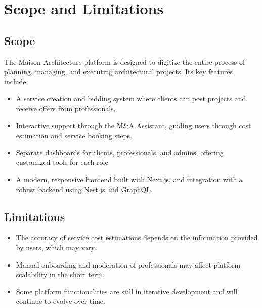 \section{Scope and Limitations}

\subsection*{Scope}
The Maison Architecture platform is designed to digitize the entire process of planning, managing, and executing architectural projects. Its key features include:
\begin{itemize}
    \item A service creation and bidding system where clients can post projects and receive offers from professionals.
    \item Interactive support through the M\&A Assistant, guiding users through cost estimation and service booking steps.
    \item Separate dashboards for clients, professionals, and admins, offering customized tools for each role.
    \item A modern, responsive frontend built with Next.js, and integration with a robust backend using Nest.js and GraphQL.
\end{itemize}

\newpage
\subsection*{Limitations}
\begin{itemize}
    \item The accuracy of service cost estimations depends on the information provided by users, which may vary.
    \item Manual onboarding and moderation of professionals may affect platform scalability in the short term.
    \item Some platform functionalities are still in iterative development and will continue to evolve over time.
\end{itemize}

